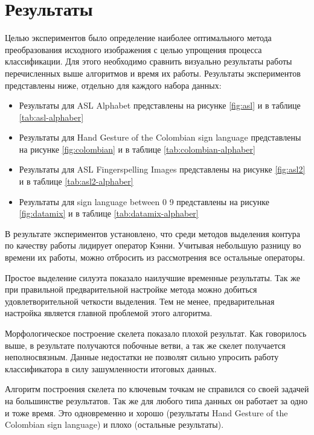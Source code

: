 \section{Результаты}
\label{sec:Results}

Целью экспериментов было определение наиболее оптимального метода преобразования исходного изображения с целью упрощения процесса классификации. Для этого необходимо сравнить визуально результаты работы перечисленных выше алгоритмов и время их работы. Результаты экспериментов представлены ниже, отдельно для каждого набора данных:

\begin{itemize}
	\item Результаты для ASL Alphabet представлены на рисунке \ref{fig:asl} и в таблице \ref{tab:asl-alphaber}
	\item Результаты для Hand Gesture of the Colombian sign language представлены на рисунке \ref{fig:colombian} и в таблице \ref{tab:colombian-alphaber}
	\item Результаты для ASL Fingerspelling Images представлены на рисунке \ref{fig:asl2} и в таблице \ref{tab:asl2-alphaber}
	\item Результаты для sign language between 0 9 представлены на рисунке \ref{fig:datamix} и в таблице \ref{tab:datamix-alphaber}
\end{itemize}



В результате экспериментов установлено, что среди методов выделения контура по качеству работы лидирует оператор Кэнни. Учитывая небольшую разницу во времени их работы, можно отбросить из рассмотрения все остальные операторы.

Простое выделение силуэта показало наилучшие временные результаты. Так же при правильной предварительной настройке метода можно добиться удовлетворительной четкости выделения. Тем не менее, предварительная настройка является главной проблемой этого алгоритма.

Морфологическое построение скелета показало плохой результат. Как говорилось выше, в результате получаются побочные ветви, а так же скелет получается неполносвязным. Данные недостатки не позволят сильно упросить работу классификатора в силу зашумленности итоговых данных.

Алгоритм построения скелета по ключевым точкам не справился со своей задачей на большинстве результатов. Так же для любого типа данных он работает за одно и тоже время. Это одновременно и хорошо (результаты Hand Gesture of the Colombian sign language) и плохо (остальные результаты).